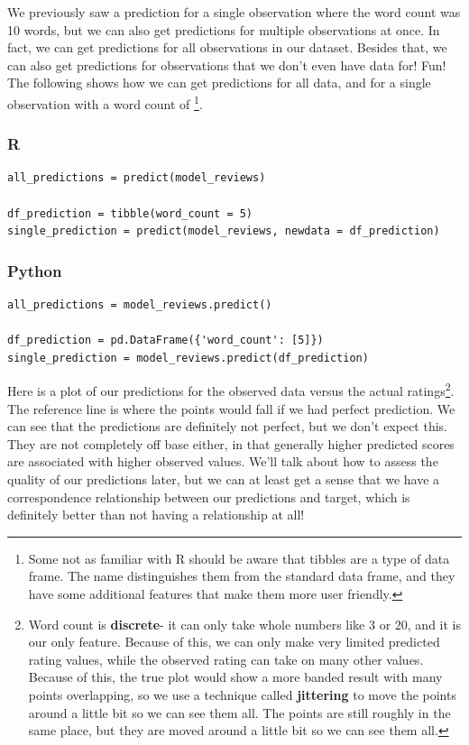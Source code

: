 \documentclass[
  letterpaper,
]{krantz}
\begin{document}
We previously saw a prediction for a single observation where the word
count was 10 words, but we can also get predictions for multiple
observations at once. In fact, we can get predictions for all
observations in our dataset. Besides that, we can also get predictions
for observations that we don't even have data for! Fun! The following
shows how we can get predictions for all data, and for a single
observation with a word count of \footnote{Some not as familiar with R
  should be aware that tibbles are a type of data frame. The name
  distinguishes them from the standard data frame, and they have some
  additional features that make them more user friendly.}.

\subsubsection{R}

\begin{verbatim}
all_predictions = predict(model_reviews)

df_prediction = tibble(word_count = 5)
single_prediction = predict(model_reviews, newdata = df_prediction)
\end{verbatim}

\subsubsection{Python}

\begin{verbatim}
all_predictions = model_reviews.predict()

df_prediction = pd.DataFrame({'word_count': [5]})
single_prediction = model_reviews.predict(df_prediction)
\end{verbatim}

Here is a plot of our predictions for the observed data versus the
actual ratings\footnote{Word count is \textbf{discrete}- it can only
  take whole numbers like 3 or 20, and it is our only feature. Because
  of this, we can only make very limited predicted rating values, while
  the observed rating can take on many other values. Because of this,
  the true plot would show a more banded result with many points
  overlapping, so we use a technique called \textbf{jittering} to move
  the points around a little bit so we can see them all. The points are
  still roughly in the same place, but they are moved around a little
  bit so we can see them all.}. The reference line is where the points
would fall if we had perfect prediction. We can see that the predictions
are definitely not perfect, but we don't expect this. They are not
completely off base either, in that generally higher predicted scores
are associated with higher observed values. We'll talk about how to
assess the quality of our predictions later, but we can at least get a
sense that we have a correspondence relationship between our predictions
and target, which is definitely better than not having a relationship at
all!
\end{document}
